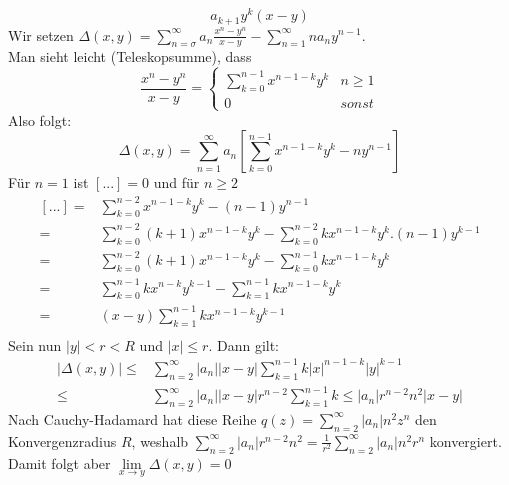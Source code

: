 \begin{Bemerkung}
{\begin{equation*}
		a_{k+1} y^k\left(x-y\right)
	\end{equation*}
	Wir setzen $\Delta\left(x,y\right) = \sum_{n=\sigma}^{\infty} a_n 
	\frac{x^n - y^n}{x-y} - \sum_{n = 1}^{\infty}n a_n y^{n-1}$. \\
	Man sieht leicht (Teleskopsumme), dass
	\begin{equation*}
		\frac{x^n-y^n}{x-y} = \begin{cases}\sum_{k=0}^{n-1}x^{n-1-k}y^k & n \geq 1 
		\\ 0 & sonst \end{cases}
	\end{equation*}
	Also folgt: 
	\begin{equation*}
		\Delta\left(x,y\right) = \sum_{n=1}^{\infty} a_n \left[ \sum_{k=0}^{n-1} 
		x^{n-1-k}y^k -ny^{n-1}\right]
	\end{equation*}
	Für $n=1$ ist $\left[...\right] = 0$ und für $n\geq 2$
	\begin{align*}
		\left[...\right]  = & \sum_{k=0}^{n-2} x^{n-1-k}y^k - (n-1)y^{n-1} \\
		 = & \sum_{k=0}^{n-2} (k+1) x^{n-1-k}y^k - \sum_{k=0}^{n-2}kx^{n-1-k}y^k 
		.(n-1)y^{k-1} \\
		= & \sum_{k=0}^{n-2} (k+1) x^{n-1-k}y^k - \sum_{k=0}^{n-1}kx^{n-1-k}y^k \\
		= & \sum_{k=0}^{n-1} k x^{n-k} y^{k-1} - \sum_{k=1}^{n-1}kx^{n-1-k}y^k \\
		= &(x -y) \sum_{k=1}^{n-1}kx^{n-1-k}y^{k-1} \\
	\end{align*}
	Sein nun $\vert y\vert < r < R$ und $|x| \leq r$. Dann gilt:
	\begin{align*}
		\vert \Delta(x,y)\vert \leq & 
		\sum_{n=2}^{\infty} |a_n| |x-y| \sum_{k=1}^{n-1} 
		k|x|^{n-1-k}|y|^{k-1} \\
		\leq & \sum_{n=2}^{\infty} |a_n| |x-y|r^{n-2} \sum_{k=1}^{n-1}k 
		\leq |a_n|r^{n-2}n^2|x-y|
	\end{align*}
	Nach Cauchy-Hadamard hat diese Reihe $q(z) = \sum_{n=2}^{\infty} |a_n|n^2z^n$ 
	den Konvergenzradius $R$, weshalb $\sum_{n=2}^{\infty} |a_n| r^{n-2} n^2 
	= \frac{1}{r^2}\sum_{n=2}^{\infty} |a_n|n^2r^n$ konvergiert.
	Damit folgt aber $\lim\limits_{x \rightarrow y}{\Delta(x,y) = 0}$
}\end{Bemerkung}

